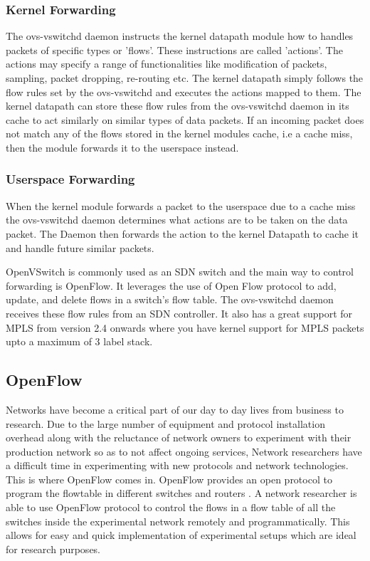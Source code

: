 \subsubsection{Kernel Forwarding}
The ovs-vswitchd daemon instructs the kernel datapath module how to handles packets of specific types or 'flows'. These instructions are called 'actions'. The actions may specify a range of functionalities like modification of packets, sampling, packet dropping, re-routing etc. The kernel datapath simply follows the flow rules set by the ovs-vswitchd and executes the actions mapped to them. The kernel datapath can store these flow rules from the ovs-vswitchd daemon in its cache to act similarly on similar types of data packets. If an incoming packet does not match any of the flows stored in the kernel modules cache, i.e a cache miss, then the module forwards it to the userspace instead.

\subsubsection{Userspace Forwarding}
When the kernel module forwards a packet to the userspace due to a cache miss the ovs-vswitchd daemon determines what actions are to be taken on the data packet. The Daemon then forwards the action to the kernel Datapath to cache it and handle future similar packets.

OpenVSwitch is commonly used as an SDN switch and the main way to control forwarding is OpenFlow. It leverages the use of Open Flow protocol to add, update, and delete flows in a switch's flow table. The ovs-vswitchd daemon receives these flow rules from an SDN controller. It also has a great support for MPLS from version 2.4 onwards where you have kernel support for MPLS packets upto a maximum of 3 label stack.

\subsection{OpenFlow}
Networks have become a critical part of our day to day lives from business to research. Due to the large number of equipment and protocol installation overhead along with the reluctance of network owners to experiment with their production network so as to not affect ongoing services, Network researchers have a difficult time in experimenting with new protocols and network technologies. This is where OpenFlow comes in. OpenFlow provides an open protocol to program the flowtable in different switches and routers \cite{mckeown2008openflow}. A network researcher is able to use OpenFlow protocol to control the flows in a flow table of all the switches inside the experimental network remotely and programmatically. This allows for easy and quick implementation of experimental setups which are ideal for research purposes.

